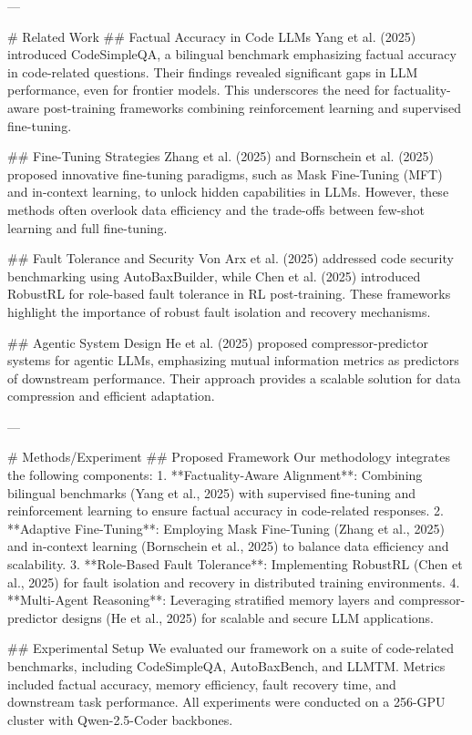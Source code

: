 ---

# Related Work  
## Factual Accuracy in Code LLMs  
Yang et al. (2025) introduced CodeSimpleQA, a bilingual benchmark emphasizing factual accuracy in code-related questions. Their findings revealed significant gaps in LLM performance, even for frontier models. This underscores the need for factuality-aware post-training frameworks combining reinforcement learning and supervised fine-tuning.

## Fine-Tuning Strategies  
Zhang et al. (2025) and Bornschein et al. (2025) proposed innovative fine-tuning paradigms, such as Mask Fine-Tuning (MFT) and in-context learning, to unlock hidden capabilities in LLMs. However, these methods often overlook data efficiency and the trade-offs between few-shot learning and full fine-tuning.

## Fault Tolerance and Security  
Von Arx et al. (2025) addressed code security benchmarking using AutoBaxBuilder, while Chen et al. (2025) introduced RobustRL for role-based fault tolerance in RL post-training. These frameworks highlight the importance of robust fault isolation and recovery mechanisms.

## Agentic System Design  
He et al. (2025) proposed compressor-predictor systems for agentic LLMs, emphasizing mutual information metrics as predictors of downstream performance. Their approach provides a scalable solution for data compression and efficient adaptation.

---

# Methods/Experiment  
## Proposed Framework  
Our methodology integrates the following components:  
1. **Factuality-Aware Alignment**: Combining bilingual benchmarks (Yang et al., 2025) with supervised fine-tuning and reinforcement learning to ensure factual accuracy in code-related responses.  
2. **Adaptive Fine-Tuning**: Employing Mask Fine-Tuning (Zhang et al., 2025) and in-context learning (Bornschein et al., 2025) to balance data efficiency and scalability.  
3. **Role-Based Fault Tolerance**: Implementing RobustRL (Chen et al., 2025) for fault isolation and recovery in distributed training environments.  
4. **Multi-Agent Reasoning**: Leveraging stratified memory layers and compressor-predictor designs (He et al., 2025) for scalable and secure LLM applications.

## Experimental Setup  
We evaluated our framework on a suite of code-related benchmarks, including CodeSimpleQA, AutoBaxBench, and LLMTM. Metrics included factual accuracy, memory efficiency, fault recovery time, and downstream task performance. All experiments were conducted on a 256-GPU cluster with Qwen-2.5-Coder backbones.

